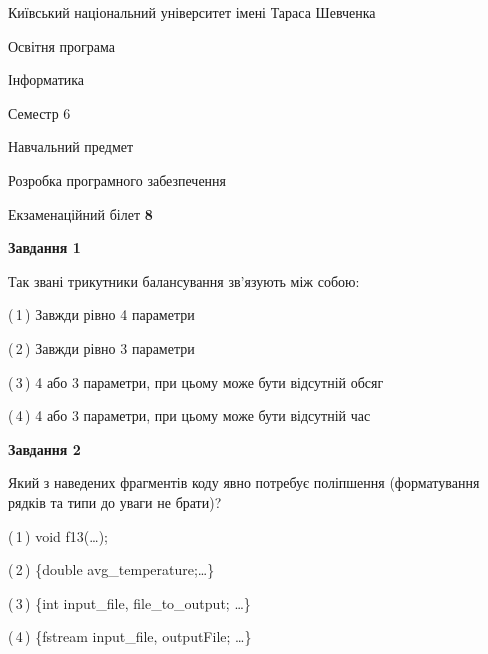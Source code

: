 \documentclass[10pt, ukrainian]{article}
\begin{document}
{{\begin {small}\par
{ \center  Київський національний університет імені Тараса Шевченка \par}
{\parbox {5 cm}{Освітня програма \hfill}{\parbox {7 cm}{Інформатика \hfill}}\parbox {6 cm}{\hfill Семестр 6}}\par
{\parbox {5 cm} {Навчальний предмет \hfill}\parbox {7 cm}{Розробка програмного забезпечення \hfill}\parbox {6cm}{\hfill}\par}\vspace{-7pt} \end{small}}{\center Екзаменаційний білет \No \textbf
{ 8 }\par}}
{
\begin {large}
{\begin {center}\textbf{Завдання 1}\end {center}}\par
Так звані трикутники балансування зв'язують між собою:\par
\vspace{2mm}



(\,1\,) Завжди рівно 4 параметри%



(\,2\,) Завжди рівно 3 параметри%



(\,3\,) 4 або 3 параметри, при цьому може бути відсутній обсяг %



(\,4\,) 4 або 3 параметри, при цьому може бути відсутній час%


{\begin {center}\textbf{Завдання 2}\end {center}}\par
Який з наведених фрагментів коду явно потребує поліпшення (форматування рядків та типи до уваги не брати)?\par
\vspace{2mm}



(\,1\,) void f13(…);%



(\,2\,) \{double avg\_temperature;…\} %



(\,3\,) \{int input\_file, file\_to\_output; …\}%



(\,4\,) \{fstream input\_file, outputFile; …\}%



\end{large}}
\end{document}
